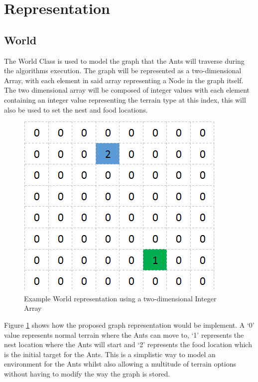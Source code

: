 \section{Representation}
\subsection{World}
\label{sec:world}
The World Class is used to model the graph that the Ants will traverse during the algorithms execution. The graph will be represented as a two-dimensional Array, with each element in said array representing a Node in the graph itself. The two dimensional array will be composed of integer values with each element containing an integer value representing the terrain type at this index, this will also be used to set the nest and food locations. 

\begin{figure}[H]
\centering
\includegraphics[scale=0.8]{Images/graph}
\caption{Example World representation using a two-dimensional Integer Array}
\label{fig:graph}
\end{figure}

\noindent
Figure \ref{fig:graph} shows how the proposed graph representation would be implement. A `0' value represents normal terrain where the Ants can move to, `1' represents the nest location where the Ants will start and `2' represents the food location which is the initial target for the Ants. This is a simplistic way to model an environment for the Ants whilst also allowing a multitude of terrain options without having to modify the way the graph is stored.

